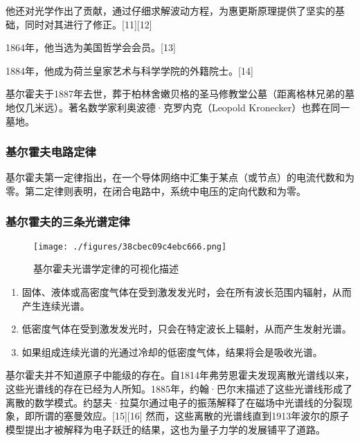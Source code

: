 他还对光学作出了贡献，通过仔细求解波动方程，为惠更斯原理提供了坚实的基础，同时对其进行了修正。[11][12]

1864年，他当选为美国哲学会会员。[13] 

1884年，他成为荷兰皇家艺术与科学学院的外籍院士。[14]

基尔霍夫于1887年去世，葬于柏林舍嫩贝格的圣马修教堂公墓（距离格林兄弟的墓地仅几米远）。著名数学家利奥波德·克罗内克（Leopold Kronecker）也葬在同一墓地。
\subsubsection{基尔霍夫电路定律}  
基尔霍夫第一定律指出，在一个导体网络中汇集于某点（或节点）的电流代数和为零。第二定律则表明，在闭合电路中，系统中电压的定向代数和为零。
\subsubsection{基尔霍夫的三条光谱定律}
\begin{figure}[ht]
\centering
\texttt{[image: ./figures/38cbec09c4ebc666.png]}
\caption{基尔霍夫光谱学定律的可视化描述} \label{fig_JRHF_3}
\end{figure}
\begin{enumerate}
\item 固体、液体或高密度气体在受到激发发光时，会在所有波长范围内辐射，从而产生连续光谱。  
\item 低密度气体在受到激发发光时，只会在特定波长上辐射，从而产生发射光谱。  
\item 如果组成连续光谱的光通过冷却的低密度气体，结果将会是吸收光谱。
\end{enumerate}
基尔霍夫并不知道原子中能级的存在。自1814年弗劳恩霍夫发现离散光谱线以来，这些光谱线的存在已经为人所知。1885年，约翰·巴尔末描述了这些光谱线形成了离散的数学模式。约瑟夫·拉莫尔通过电子的振荡解释了在磁场中光谱线的分裂现象，即所谓的塞曼效应。[15][16] 然而，这些离散的光谱线直到1913年波尔的原子模型提出才被解释为电子跃迁的结果，这也为量子力学的发展铺平了道路。